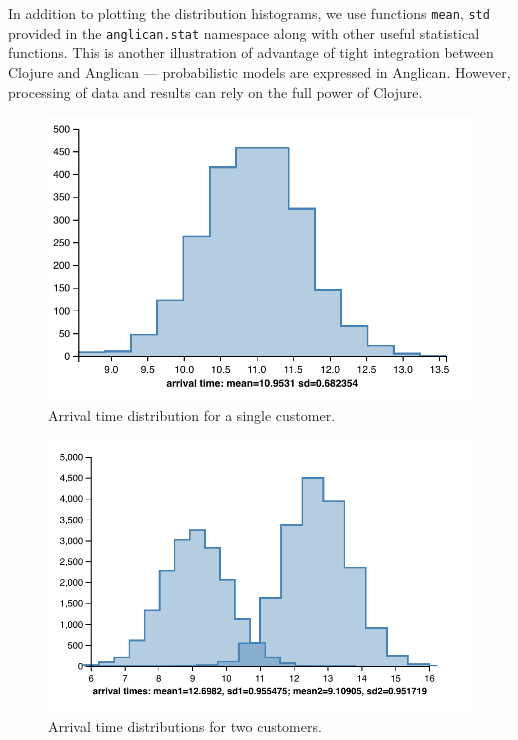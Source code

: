 \documentclass[preprint]{sigplanconf}
\begin{document}
In addition to plotting the distribution histograms, we use
functions \texttt{mean}, \texttt{std} provided
in the \texttt{anglican.{\linebreak[0]}stat} namespace
along with other
useful statistical functions.
This is another illustration of advantage of tight
integration between Clojure and Anglican --- probabilistic
models are expressed in Anglican. However, processing of data and
results can rely on the full power of Clojure.

\begin{figure}
    \includegraphics[trim={12pt 0 0 0},scale=0.7]{same-customer-time.pdf}
    \caption{Arrival time distribution for a single customer.}
    \label{fig:dist-same}
\end{figure}

\begin{figure}
    \includegraphics[trim={12pt 0 0 0},scale=0.7]{different-customers-times.pdf}
    \caption{Arrival time distributions for two customers.}
    \label{fig:dist-diff}
\end{figure}
\end{document}
